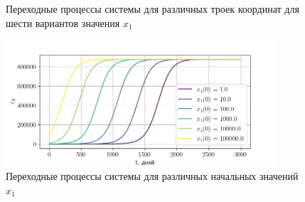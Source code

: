 \documentclass[14pt,a4paper]{extarticle}
\begin{document}
\begin{example}
		\begin{figure}[h]
			\centering
			\caption{Переходные процессы системы для различных троек координат для шести вариантов значения $x_1$}
			\label{fig:in_D_3d}
		\end{figure}
		\begin{figure}[h]
			\centering
			\includegraphics[width=0.90\textwidth]{media/Figure_11.png}
			\caption{Переходные процессы системы для различных начальных значений~$x_1$}
			\label{fig:x1_transitions}
		\end{figure}
		

\end{example}
\end{document}
